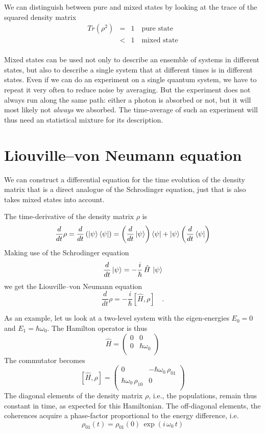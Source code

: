 We can distinguish between pure and mixed states by looking at the trace of the squared density matrix
\begin{eqnarray*}
 Tr (\rho^2) & = & 1 \quad \text{pure state} \\
 				& < & 1 \quad \text{mixed state} \\
\end{eqnarray*}

Mixed states can be  used not only to describe an ensemble of systems in different states, but also to describe a single system that at different times is in different states. Even if we can do an experiment on  a single quantum system, we have to repeat it very often to reduce noise by averaging. But the experiment does not always run along the same path: either a photon is absorbed or not, but it will most likely not \emph{always}  we absorbed. The time-average of such an experiment will thus need  an statistical mixture for its description.

\section{Liouville--von Neumann equation}

We can construct a differential equation for the time evolution of the density matrix that is a direct analogue of the Schrodinger equation, just that is also takes mixed states into account.

The time-derivative of the density matrix $\rho$ is
\[
 \frac{d}{dt} \rho = \frac{d}{dt} \left( \ket{\psi} \bra{\psi} \right) 
 =  \left( \frac{d}{dt}  \ket{\psi} \right) \bra{\psi} 
 + \ket{\psi} \left( \frac{d}{dt}  \bra{\psi} \right) 
\]
Making use of the Schrodinger equation
\[
 \frac{d}{dt} \ket{\psi} = - \frac{i}{\hbar} \, \hat{H} \, \ket{\psi}
\]
we get the Liouville--von Neumann equation
\[
 \frac{d}{dt} \rho = - \frac{i}{\hbar} 
 \left[ \hat{H} , \rho \right]  \quad .
\]

As an example, let us look at a two-level system with the eigen-energies $E_0= 0$ and $E_1 = \hbar \omega_0$. The Hamilton operator is thus
\[
 \hat{H } = \begin{pmatrix}
  0 & 0 \\ 0 & \hbar \omega_0 \\
 \end{pmatrix}
\]
The commutator becomes
\[
 \left[ \hat{H}, \rho \right] = 
 \begin{pmatrix}
 0 & - \hbar \omega_0 \, \rho_{01} \\   \hbar \omega_0 \, \rho_{10} & 0 \\
 \end{pmatrix}
\]
The  diagonal elements of the density matrix $\rho$, i.e., the populations, remain thus constant in time, as expected for this Hamiltonian. The off-diagonal elements, the coherences acquire a phase-factor proportional to the energy difference, i.e.
\[
 \rho_{01}(t) =  \rho_{01}(0) \, \exp \left(i \, \omega_0 \, t \right) 
\]

